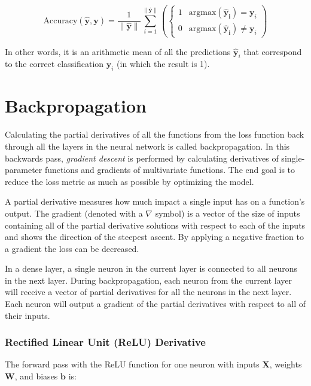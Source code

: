 \documentclass[a4paper]{report}
\newcommand{\matr}[1]{\mathbf{#1}}
\newcommand{\vect}[1]{\bm{#1}}
\newcommand{\argmax}{\text{argmax}}
\begin{document}
\begin{equation*}
    \text{Accuracy}(\vect{\hat{y}},\vect{y}) = \frac{1}{\|\vect{\hat{y}}\|} \sum_{i=1}^{\|\vect{\hat{y}}\|} \left( \begin{cases}
                1 & \argmax(\vect{\hat{y}_i}) = \vect{y}_i \\
                0 & \argmax(\vect{\hat{y}_i}) \not= \vect{y}_i
            \end{cases}
            \right)
\end{equation*}

In other words, it is an arithmetic mean of all the predictions $\vect{\hat{y}}_i$ that correspond to the correct classification $\vect{y}_i$ (in which the result is 1).

\section{Backpropagation}
Calculating the partial derivatives of all the functions from the loss function back through all the
layers in the neural network is called backpropagation. In this backwards pass, \emph{gradient descent} is performed by calculating derivatives of single-parameter functions and gradients of multivariate functions. The end goal is to reduce the loss metric as much as possible by optimizing the model.

A partial derivative measures how much impact a single input has on a function's output. The gradient (denoted with a $\nabla$ symbol) is a vector of the size of inputs containing all of the partial derivative solutions with respect to each of the inputs and shows the direction of the steepest ascent. By applying a negative fraction to a gradient the loss can be decreased.

In a dense layer, a single neuron in the current layer is connected to all neurons in the next 
layer. During backpropagation, each neuron from the current layer will receive a vector of partial 
derivatives for all the neurons in the next layer. Each neuron will output a gradient of the partial derivatives with respect to all of their inputs.

\subsubsection*{Rectified Linear Unit (ReLU) Derivative}

The forward pass with the ReLU function for one neuron with inputs $\matr{X}$, weights $\matr{W}$, and biases $\vect{b}$ is:
\end{document}
